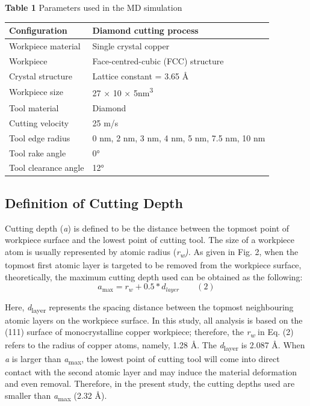 \documentclass{article}
\begin{document}
\noindent\textbf{Table 1} Parameters used in the MD simulation\par
\begin{center}\small
\begin{tabular}{ll}
\toprule
Configuration & Diamond cutting process\\
\midrule
Workpiece material & Single crystal copper\\
Workpiece & Face-centred-cubic (FCC) structure\\
Crystal structure & Lattice constant = 3.65 Å\\
Workpiece size & 27 × 10 × 5nm\textsuperscript{3}\\
Tool material & Diamond\\
Cutting velocity & 25 m/s\\
Tool edge radius & 0 nm, 2 nm, 3 nm, 4 nm, 5 nm, 7.5 nm, 10 nm\\
Tool rake angle & 0°\\
Tool clearance angle & 12°\\
\bottomrule
\end{tabular}
\end{center}

\subsection*{Definition of Cutting Depth}

Cutting depth (\emph{a}) is defined to be the distance between the topmost point of workpiece surface and the lowest point of cutting tool. The size of a workpiece atom is usually represented by atomic radius (\emph{r}\textsubscript{\emph{w}}\emph{).} As given in Fig. 2, when the topmost first atomic layer is targeted to be removed from the workpiece surface, theoretically, the maximum cutting depth used can be obtained as the following:
\[
a_{\max} = r_w + 0.5{\ast}d_{layer} \qquad (2)
\]

Here, \emph{d}\textsubscript{layer} represents the spacing distance between the topmost neighbouring atomic layers on the workpiece surface. In this study, all analysis is based on the (111) surface of monocrystalline copper workpiece; therefore, the \emph{r}\textsubscript{\emph{w}} in Eq. (2) refers to the radius of copper atoms, namely, 1.28 Å. The \emph{d}\textsubscript{layer} is 2.087 Å. When \emph{a} is larger than \emph{a}\textsubscript{max}, the lowest point of cutting tool will come into direct contact with the second atomic layer and may induce the material deformation and even removal. Therefore, in the present study, the cutting depths used are smaller than \emph{a}\textsubscript{max} (2.32 Å).
\end{document}
